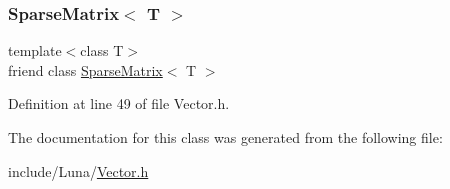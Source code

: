 \subsubsection{\texorpdfstring{Sparse\+Matrix$<$ T $>$}{SparseMatrix< T >}}
{\footnotesize\ttfamily template$<$class T$>$ \\
friend class \hyperlink{classLuna_1_1SparseMatrix}{Sparse\+Matrix}$<$ T $>$\hspace{0.3cm}{\ttfamily [friend]}}



Definition at line 49 of file Vector.\+h.



The documentation for this class was generated from the following file\+:\begin{DoxyCompactItemize}
\item 
include/\+Luna/\hyperlink{Vector_8h}{Vector.\+h}\end{DoxyCompactItemize}

